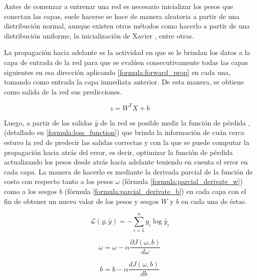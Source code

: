  Antes de comenzar a entrenar una red es necesario inicializar los pesos que conectan las capas, suele hacerse se hace de manera aleatoria a partir de una distribución normal, aunque existen otros métodos como hacerlo a partir de una distribución uniforme, la inicialización de Xavier \cite{glorot2010understanding}, entre otras.
 
 La propagación hacia adelante \cite{russell2016artificial} es la actividad en que se le brindan los datos a la capa de entrada de la red para que se evalúen consecutivamente todas las capas siguientes en esa dirección aplicando \ref{formula:forward_prop} en cada una, tomando como entrada la capa inmediata anterior. De esta manera, se obtiene como salida de la red sus predicciones. 
 
 \begin{equation}\label{formula:forward_prop}
 z=W^{T} X+b
 \end{equation}
 
 Luego, a partir de las salidas \(\hat{y}\) de la red es posible medir la función de pérdida \cite{russell2016artificial}, \cite{zhao2016loss} (detallado en \ref{formula:loss_function}) que brinda la información de cuán cerca estuvo la red de predecir las salidas correctas y con la que se puede computar la propagación hacia atrás del error, es decir, optimizar la función de pérdida actualizando los pesos desde atrás hacia adelante teniendo en cuenta el error en cada capa. La manera de hacerlo es mediante la derivada parcial de la función de costo con respecto tanto a los pesos \(\omega\) (fórmula \ref{formula:parcial_derivate_w}) como a los sesgos \(b\) (fórmula \ref{formula:parcial_derivate_b}) en cada capa con el fin de obtener un nuevo valor de los pesos y sesgos \(W\) y \(b\) en cada una de éstas.
  
 \begin{equation}\label{formula:loss_function}
 \mathcal{L}(y, \hat{y})=-\sum_{i=1}^{n} y_{i} \log \hat{y}_{i}
 \end{equation}
 
 \begin{equation}\label{formula:parcial_derivate_w}
 \omega =\omega-\alpha \frac{\partial J(\omega, b)}{d \omega}
 \end{equation}
 
 \begin{equation}\label{formula:parcial_derivate_b}
 b=b-\alpha \frac{d J(\omega, b)}{d b}
 \end{equation}
 
